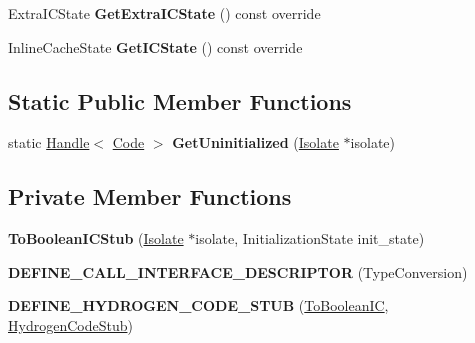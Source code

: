 \begin{DoxyCompactItemize}
\item 
Extra\+I\+C\+State {\bfseries Get\+Extra\+I\+C\+State} () const  override\hypertarget{classv8_1_1internal_1_1_to_boolean_i_c_stub_ab0c5e1f77f60ff0cb8e23fdcb86848c7}{}\label{classv8_1_1internal_1_1_to_boolean_i_c_stub_ab0c5e1f77f60ff0cb8e23fdcb86848c7}

\item 
Inline\+Cache\+State {\bfseries Get\+I\+C\+State} () const  override\hypertarget{classv8_1_1internal_1_1_to_boolean_i_c_stub_a231e7531f64d196668a6887b5d90fe90}{}\label{classv8_1_1internal_1_1_to_boolean_i_c_stub_a231e7531f64d196668a6887b5d90fe90}

\end{DoxyCompactItemize}
\subsection*{Static Public Member Functions}
\begin{DoxyCompactItemize}
\item 
static \hyperlink{classv8_1_1internal_1_1_handle}{Handle}$<$ \hyperlink{classv8_1_1internal_1_1_code}{Code} $>$ {\bfseries Get\+Uninitialized} (\hyperlink{classv8_1_1internal_1_1_isolate}{Isolate} $\ast$isolate)\hypertarget{classv8_1_1internal_1_1_to_boolean_i_c_stub_aa045c7bbff138760582ab802829577eb}{}\label{classv8_1_1internal_1_1_to_boolean_i_c_stub_aa045c7bbff138760582ab802829577eb}

\end{DoxyCompactItemize}
\subsection*{Private Member Functions}
\begin{DoxyCompactItemize}
\item 
{\bfseries To\+Boolean\+I\+C\+Stub} (\hyperlink{classv8_1_1internal_1_1_isolate}{Isolate} $\ast$isolate, Initialization\+State init\+\_\+state)\hypertarget{classv8_1_1internal_1_1_to_boolean_i_c_stub_a65c0efd29c0e5e18dfc7bd7d273c5a6a}{}\label{classv8_1_1internal_1_1_to_boolean_i_c_stub_a65c0efd29c0e5e18dfc7bd7d273c5a6a}

\item 
{\bfseries D\+E\+F\+I\+N\+E\+\_\+\+C\+A\+L\+L\+\_\+\+I\+N\+T\+E\+R\+F\+A\+C\+E\+\_\+\+D\+E\+S\+C\+R\+I\+P\+T\+OR} (Type\+Conversion)\hypertarget{classv8_1_1internal_1_1_to_boolean_i_c_stub_a442fda9abc9659a66d658726f5f0a199}{}\label{classv8_1_1internal_1_1_to_boolean_i_c_stub_a442fda9abc9659a66d658726f5f0a199}

\item 
{\bfseries D\+E\+F\+I\+N\+E\+\_\+\+H\+Y\+D\+R\+O\+G\+E\+N\+\_\+\+C\+O\+D\+E\+\_\+\+S\+T\+UB} (\hyperlink{classv8_1_1internal_1_1_to_boolean_i_c}{To\+Boolean\+IC}, \hyperlink{classv8_1_1internal_1_1_hydrogen_code_stub}{Hydrogen\+Code\+Stub})\hypertarget{classv8_1_1internal_1_1_to_boolean_i_c_stub_a91c412f49afd65b9680156e30f46fc7a}{}\label{classv8_1_1internal_1_1_to_boolean_i_c_stub_a91c412f49afd65b9680156e30f46fc7a}

\end{DoxyCompactItemize}
